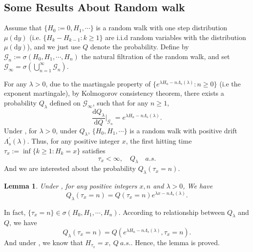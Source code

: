 \documentclass[]{article}
\makeatletter
\numberwithin{equation}{section}
\renewenvironment{proof}[1][\proofname]{%
	\par\pushQED{\qed}\normalfont%
	\topsep6\p@\@plus6\p@\relax
	\trivlist\item[\hskip\labelsep\bfseries#1\@addpunct{.}]%
	\ignorespaces
}{%
	\popQED\endtrivlist\@endpefalse
}
\theoremstyle{thmstyleone}%
\theoremstyle{thmstyletwo}%
\theoremstyle{thmstylethree}%
\theoremstyle{thmstylefour}%
\newtheorem{lemma}{Lemma}
\theoremstyle{thmstylefive}%
\theoremstyle{thmstylesix}%
\renewcommand{\d}{\mathrm{d}}
\makeatother
\begin{document}
	\subsection{Some Results About Random walk}\label{Section2.1}
	
	Assume that $ \{H_0:=0,H_1,\cdots\}$ is a random walk with one step distribution $\mu(\d y)$ (i.e. $\{H_k-H_{k-1}:k\geqslant 1\}$ are i.i.d random variables with the distribution $\mu(\d y)$), and we just use $Q$ denote the probability.
	Define by $\mathcal{G}_n:= \sigma(H_0,H_1,\cdots,H_n)$ the natural filtration of the random walk, and set $\mathcal{G}_\infty = \sigma\left(\bigcup\limits_{n=1}^\infty\mathcal{G}_n\right) $.
	
	For any $\lambda > 0$, due to the martingale property of $ \{e^{\lambda H_n-n\Lambda_s(\lambda)}:n\geqslant 0\} $ (i.e the exponent martingale), by Kolmogorov consistency theorem, there exists a probability $ Q_\lambda $ defined on $\mathcal{G}_\infty$, such that
	for any $n\geqslant 1$, \begin{equation}\label{key}
		\frac{\d Q_\lambda}{\d Q}\big|_{\mathcal{G}_n} = e^{\lambda H_n-n\Lambda_s(\lambda)}.
	\end{equation}
	Under , for $\lambda >0$, under $Q_\lambda$, $\{H_0,H_1,\cdots\}$ is a random walk with positive drift $\Lambda_s^{\prime}(\lambda)$.
	Thus, for any positive integer $x$, the first hitting time $ \tau_x:=\inf\{k\geqslant1:H_k=x\} $ satisfies
	\begin{equation*}
		\tau_x<\infty,\quad  Q_\lambda \quad a.s.
	\end{equation*}
	And we are interested about the probability $Q_\lambda(\tau_x = n)$.
	
	\begin{lemma}\label{Hitting time of Random walk}
		Under , for any positive integers $x,n$ and $\lambda>0$, We have
		\begin{equation*}
			Q_\lambda(\tau_x = n)
			=Q(\tau_x = n) e^{\lambda x-n\Lambda_s(\lambda)}.
		\end{equation*}
	\end{lemma}
	
	\begin{proof}[Proof of \Cref{Hitting time of Random walk}]
		In fact, $\{\tau_x = n\} \in \sigma(H_0,H_1,\cdots,H_n)$.
		According to relationship between $Q_\lambda$ and $Q$, we have
		\begin{equation*}
			Q_\lambda(\tau_x = n)
			=
			Q (e^{\lambda H_n-n\Lambda_s(\lambda)},\tau_x=n).
		\end{equation*}
		And under , we know that $H_{\tau_x} = x,~ Q~a.s.$.
		Hence, the lemma is proved.
	\end{proof}
	
\end{document}
